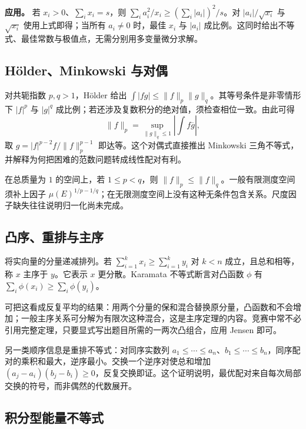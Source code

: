 \documentclass[12pt,fontset=fandol]{ctexart}
\begin{document}
\textbf{应用。} 若 $x_i>0$、$\sum_i x_i=s$，则 $\sum_i a_i^2/x_i\geq(\sum_i|a_i|)^2/s$。对 $|a_i|/\sqrt{x_i}$ 与 $\sqrt{x_i}$ 使用上式即得；当所有 $a_i\neq0$ 时，最佳 $x_i$ 与 $|a_i|$ 成比例。这同时给出不等式、最佳常数与极值点，无需分别用多变量微分求解。

\subsection{Hölder、Minkowski 与对偶}

\label{app:inequality-holder}

对共轭指数 $p,q>1$，Hölder 给出 $\int|fg|\leq\|f\|_p\|g\|_q$。其等号条件是非零情形下 $|f|^p$ 与 $|g|^q$ 成比例；若还涉及复数积分的绝对值，须检查相位一致。由此可得
\[
\|f\|_p=\sup_{\|g\|_q\leq1}\left|\int f\overline g\right|,
\]
取 $g=|f|^{p-2}f/\|f\|_p^{p-1}$ 即达等。这个对偶式直接推出 Minkowski 三角不等式，并解释为何把困难的范数问题转成线性配对有利。

在总质量为 $1$ 的空间上，若 $1\leq p<q$，则 $\|f\|_p\leq\|f\|_q$。一般有限测度空间须补上因子 $\mu(E)^{1/p-1/q}$；在无限测度空间上没有这种无条件包含关系。尺度因子缺失往往说明归一化尚未完成。

\subsection{凸序、重排与主序}

\label{app:inequality-majorization}

将实向量的分量递减排列。若 $\sum_{i=1}^kx_i\geq\sum_{i=1}^ky_i$ 对 $k<n$ 成立，且总和相等，称 $x$ 主序于 $y$。它表示 $x$ 更分散。Karamata 不等式断言对凸函数 $\phi$ 有 $\sum_i\phi(x_i)\geq\sum_i\phi(y_i)$。

可把这看成反复平均的结果：用两个分量的保和混合替换原分量，凸函数和不会增加；一般主序关系可分解为有限次这种混合，这是主序定理的内容。竞赛中常不必引用完整定理，只要显式写出题目所需的一两次凸组合，应用 Jensen 即可。

另一类顺序信息是重排不等式：对同序实数列 $a_1\leq\cdots\leq a_n$、$b_1\leq\cdots\leq b_n$，同序配对的乘积和最大，逆序最小。交换一个逆序对使总和增加 $(a_j-a_i)(b_j-b_i)\geq0$，反复交换即证。这个证明说明，最优配对来自每次局部交换的符号，而非偶然的代数展开。

\subsection{积分型能量不等式}

\label{app:inequality-energy}
\end{document}
